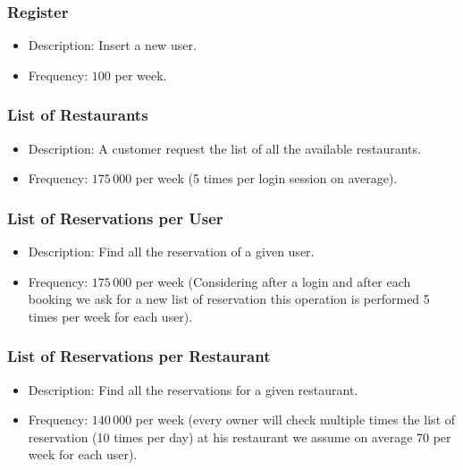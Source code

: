 \subsubsection{Register}

\begin{itemize}
	\item Description: Insert a new user.
	\item Frequency: \(100\) per week.
\end{itemize}

\subsubsection{List of Restaurants}

\begin{itemize}
	\item Description: A customer request the list of all the available
		restaurants.
	\item Frequency: \(175\,000\) per week (5 times per login session on
		average).
\end{itemize}

\subsubsection{List of Reservations per User}

\begin{itemize}
	\item Description: Find all the reservation of a given user.
	\item Frequency: \(175\,000\) per week (Considering after a login and after each booking we ask for a new list of reservation this operation is performed 5 times per week for each user).
\end{itemize}

\subsubsection{List of Reservations per Restaurant}

\begin{itemize}
	\item Description: Find all the reservations for a given restaurant.
	\item Frequency: \(140\,000\) per week (every owner will check multiple times the list of reservation (10 times per day) at his restaurant we assume on average 70 per week for each user).
\end{itemize}

